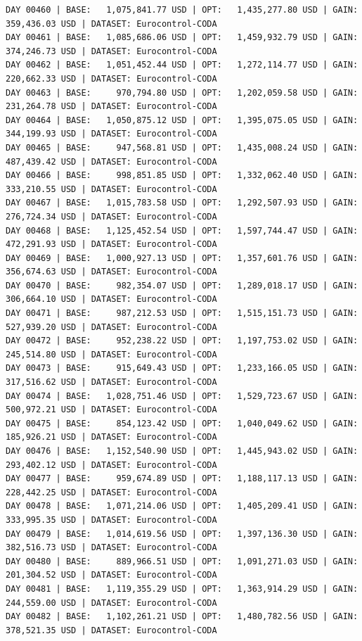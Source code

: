\documentclass[11pt,a4paper]{article}
\begin{document}
\begin{verbatim}
DAY 00460 | BASE:   1,075,841.77 USD | OPT:   1,435,277.80 USD | GAIN: 359,436.03 USD | DATASET: Eurocontrol-CODA
DAY 00461 | BASE:   1,085,686.06 USD | OPT:   1,459,932.79 USD | GAIN: 374,246.73 USD | DATASET: Eurocontrol-CODA
DAY 00462 | BASE:   1,051,452.44 USD | OPT:   1,272,114.77 USD | GAIN: 220,662.33 USD | DATASET: Eurocontrol-CODA
DAY 00463 | BASE:     970,794.80 USD | OPT:   1,202,059.58 USD | GAIN: 231,264.78 USD | DATASET: Eurocontrol-CODA
DAY 00464 | BASE:   1,050,875.12 USD | OPT:   1,395,075.05 USD | GAIN: 344,199.93 USD | DATASET: Eurocontrol-CODA
DAY 00465 | BASE:     947,568.81 USD | OPT:   1,435,008.24 USD | GAIN: 487,439.42 USD | DATASET: Eurocontrol-CODA
DAY 00466 | BASE:     998,851.85 USD | OPT:   1,332,062.40 USD | GAIN: 333,210.55 USD | DATASET: Eurocontrol-CODA
DAY 00467 | BASE:   1,015,783.58 USD | OPT:   1,292,507.93 USD | GAIN: 276,724.34 USD | DATASET: Eurocontrol-CODA
DAY 00468 | BASE:   1,125,452.54 USD | OPT:   1,597,744.47 USD | GAIN: 472,291.93 USD | DATASET: Eurocontrol-CODA
DAY 00469 | BASE:   1,000,927.13 USD | OPT:   1,357,601.76 USD | GAIN: 356,674.63 USD | DATASET: Eurocontrol-CODA
DAY 00470 | BASE:     982,354.07 USD | OPT:   1,289,018.17 USD | GAIN: 306,664.10 USD | DATASET: Eurocontrol-CODA
DAY 00471 | BASE:     987,212.53 USD | OPT:   1,515,151.73 USD | GAIN: 527,939.20 USD | DATASET: Eurocontrol-CODA
DAY 00472 | BASE:     952,238.22 USD | OPT:   1,197,753.02 USD | GAIN: 245,514.80 USD | DATASET: Eurocontrol-CODA
DAY 00473 | BASE:     915,649.43 USD | OPT:   1,233,166.05 USD | GAIN: 317,516.62 USD | DATASET: Eurocontrol-CODA
DAY 00474 | BASE:   1,028,751.46 USD | OPT:   1,529,723.67 USD | GAIN: 500,972.21 USD | DATASET: Eurocontrol-CODA
DAY 00475 | BASE:     854,123.42 USD | OPT:   1,040,049.62 USD | GAIN: 185,926.21 USD | DATASET: Eurocontrol-CODA
DAY 00476 | BASE:   1,152,540.90 USD | OPT:   1,445,943.02 USD | GAIN: 293,402.12 USD | DATASET: Eurocontrol-CODA
DAY 00477 | BASE:     959,674.89 USD | OPT:   1,188,117.13 USD | GAIN: 228,442.25 USD | DATASET: Eurocontrol-CODA
DAY 00478 | BASE:   1,071,214.06 USD | OPT:   1,405,209.41 USD | GAIN: 333,995.35 USD | DATASET: Eurocontrol-CODA
DAY 00479 | BASE:   1,014,619.56 USD | OPT:   1,397,136.30 USD | GAIN: 382,516.73 USD | DATASET: Eurocontrol-CODA
DAY 00480 | BASE:     889,966.51 USD | OPT:   1,091,271.03 USD | GAIN: 201,304.52 USD | DATASET: Eurocontrol-CODA
DAY 00481 | BASE:   1,119,355.29 USD | OPT:   1,363,914.29 USD | GAIN: 244,559.00 USD | DATASET: Eurocontrol-CODA
DAY 00482 | BASE:   1,102,261.21 USD | OPT:   1,480,782.56 USD | GAIN: 378,521.35 USD | DATASET: Eurocontrol-CODA

\end{verbatim}
\end{document}
